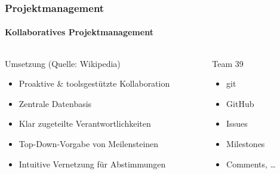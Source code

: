 \begin{frame}
	\frametitle{Projektmanagement \hfill \footnotesize \group}
	\framesubtitle{Kollaboratives Projektmanagement}
	\begin{columns}
		\begin{column}{0.7\textwidth}
			\begin{block}{Umsetzung (Quelle: Wikipedia)}
				\begin{itemize}
					\item Proaktive \& toolsgestützte Kollaboration
					\item Zentrale Datenbasis
					\item Klar zugeteilte Verantwortlichkeiten
					\item Top-Down-Vorgabe von Meilensteinen
					\item Intuitive Vernetzung für Abstimmungen
				\end{itemize}
			\end{block}
		\end{column}
		\pause
		\begin{column}{0.3\textwidth}
			\begin{exampleblock}{Team 39}
				\begin{itemize}
					\item git
					\item GitHub
					\item Issues
					\item Milestones
					\item Comments, \dots
				\end{itemize}
			\end{exampleblock}
		\end{column}
	\end{columns}
\end{frame}

